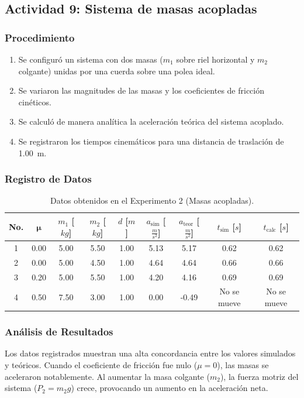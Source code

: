 \documentclass[11pt,a4paper]{article}
\begin{document}
\subsection{Actividad 9: Sistema de masas acopladas}
\subsubsection{Procedimiento}
\begin{enumerate}
    \item Se configuró un sistema con dos masas ($m_1$ sobre riel horizontal y $m_2$ colgante) unidas por una cuerda sobre una polea ideal.
    \item Se variaron las magnitudes de las masas y los coeficientes de fricción cinéticos.
    \item Se calculó de manera analítica la aceleración teórica del sistema acoplado.
    \item Se registraron los tiempos cinemáticos para una distancia de traslación de \SI{1.00}{\meter}.
\end{enumerate}

\subsubsection{Registro de Datos}
\begin{table}[H]
\centering
\caption{Datos obtenidos en el Experimento 2 (Masas acopladas).}
\begin{tabularx}{\textwidth}{@{} c C C C C C C C C @{}}
\toprule
\textbf{No.} & $\boldsymbol{\mu}$ & \textbf{$m_1$ [$kg$]} & \textbf{$m_2$ [$kg$]} & \textbf{$d$ [$m$]} & \textbf{$a_{\text{sim}}$ [$\frac{m}{s^2}$]} & \textbf{$a_{\text{teor}}$ [$\frac{m}{s^2}$]} & \textbf{$t_{\text{sim}}$ [$s$]} & \textbf{$t_{\text{calc}}$ [$s$]} \\  & 0.00 & 5.00 & 5.50 & 1.00 & 5.13 & 5.17 & 0.62 & 0.62 \\
2 & 0.00 & 5.00 & 4.50 & 1.00 & 4.64 & 4.64 & 0.66 & 0.66 \\
3 & 0.20 & 5.00 & 5.50 & 1.00 & 4.20 & 4.16 & 0.69 & 0.69 \\
4 & 0.50 & 7.50 & 3.00 & 1.00 & 0.00 & -0.49 & No se mueve & No se mueve \\
\bottomrule
\end{tabularx}
\end{table}

\subsubsection{Análisis de Resultados}
Los datos registrados muestran una alta concordancia entre los valores simulados y teóricos. Cuando el coeficiente de fricción fue nulo ($\mu = 0$), las masas se aceleraron notablemente. Al aumentar la masa colgante ($m_2$), la fuerza motriz del sistema ($P_2 = m_2 g$) crece, provocando un aumento en la aceleración neta.
\end{document}
